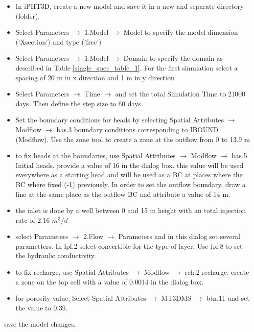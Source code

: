 \begin{itemize}

\item In iPHT3D, create a new model and save it in a new and separate directory (folder).

\item Select Parameters $\rightarrow$ 1.Model $\rightarrow$ Model to specify the model dimension ('Xsection')
and type ('free')
\item Select Parameters $\rightarrow$ 1.Model $\rightarrow$ Domain to specify
the domain as described in Table \ref{single_spec_table_1}. For the first simulation select a spacing of 20 m in x direction
and 1 m in y direction

\item Select Parameters $\rightarrow$ Time $\rightarrow$ and set the total Simulation Time to 21000 days. Then define the step size to 60 days

\item Set the boundary conditions for heads by selecting Spatial Attributes $\rightarrow$ Modflow $\rightarrow$ bas.3 boundary conditions corresponding to
IBOUND (Modflow). Use the zone tool to create a zone at the outflow from 0 to 13.9 m

\item to fix heads at the boundaries, use Spatial Attributes $\rightarrow$ Modflow $\rightarrow$ bas.5 Initial heads. provide a value of 16 in the dialog box.
this value will be used everywhere as a starting head and will be used as a BC at places where the BC where fixed (-1) previously. In order to 
set the outflow boundary, draw a line at the same place as the outflow BC and attribute a value of 14 m.

\item the inlet is done by a well between 0 and 15 m height with an total injection rate of 2.16 $m^3/d$

\item select Parameters $\rightarrow$ 2.Flow $\rightarrow$ Parameters and in this dialog set several parametters. 
In lpf.2 select convertible for the type of layer. Use lpf.8 to set the hydraulic conductivity.

\item to fix recharge, use Spatial Attributes $\rightarrow$ Modflow $\rightarrow$ rch.2 recharge. create a zone 
on the top cell with a value of 0.0014 in the dialog box.

\item for porosity value, Select Spatial Attributes $\rightarrow$ MT3DMS $\rightarrow$ btn.11 and set the value to 0.39. 

\end{itemize}
save the model changes.

